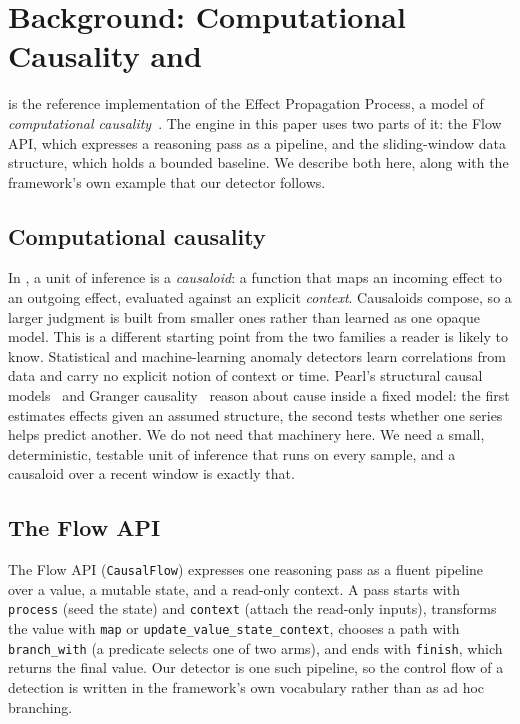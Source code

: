 \section{Background: Computational Causality and \dc}
\label{sec:background}

\dc{} is the reference implementation of the Effect Propagation Process, a model
of \emph{computational causality}~\citep{deepcausality}. The engine in this paper
uses two parts of it: the Flow API, which expresses a reasoning pass as a pipeline,
and the sliding-window data structure, which holds a bounded baseline. We describe
both here, along with the framework's own example that our detector follows.

\subsection{Computational causality}
In \dc{}, a unit of inference is a \emph{causaloid}: a function that maps an
incoming effect to an outgoing effect, evaluated against an explicit
\emph{context}. Causaloids compose, so a larger judgment is built from smaller
ones rather than learned as one opaque model. This is a different starting point
from the two families a reader is likely to know. Statistical and machine-learning
anomaly detectors learn correlations from data and carry no explicit notion of
context or time. Pearl's structural causal models~\citep{pearl2009causality} and
Granger causality~\citep{granger1969causality} reason about cause inside a fixed
model: the first estimates effects given an assumed structure, the second tests
whether one series helps predict another. We do not need that machinery here. We
need a small, deterministic, testable unit of inference that runs on every sample,
and a causaloid over a recent window is exactly that.

\subsection{The Flow API}
The Flow API (\texttt{CausalFlow}) expresses one reasoning pass as a fluent
pipeline over a value, a mutable state, and a read-only context. A pass starts
with \texttt{process} (seed the state) and \texttt{context} (attach the read-only
inputs), transforms the value with \texttt{map} or
\texttt{update\_value\_state\_context}, chooses a path with \texttt{branch\_with}
(a predicate selects one of two arms), and ends with \texttt{finish}, which
returns the final value. Our detector is one such pipeline, so the control flow of
a detection is written in the framework's own vocabulary rather than as ad hoc
branching.

